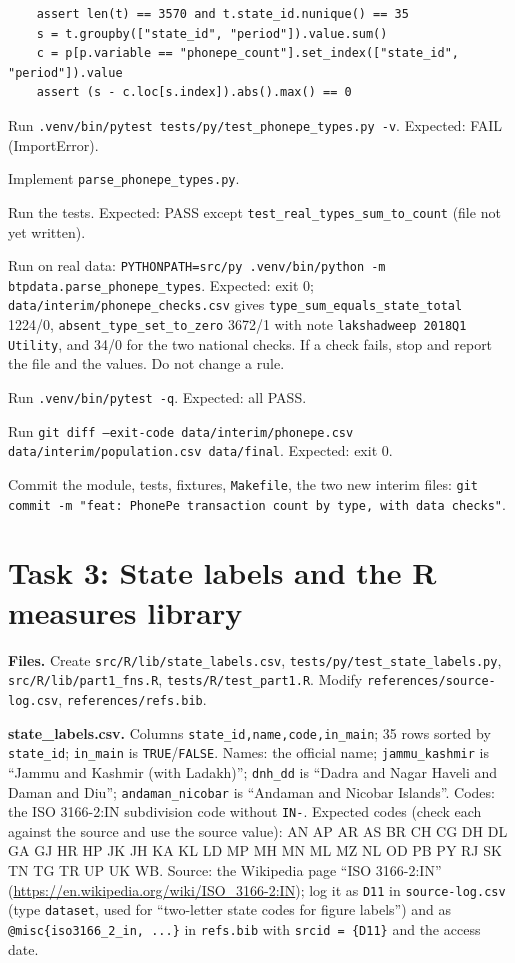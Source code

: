 \documentclass[10pt,a4paper]{article}
\newcommand{\f}[1]{\texttt{#1}}
\begin{document}
\begin{steps}
\begin{verbatim}
    assert len(t) == 3570 and t.state_id.nunique() == 35
    s = t.groupby(["state_id", "period"]).value.sum()
    c = p[p.variable == "phonepe_count"].set_index(["state_id", "period"]).value
    assert (s - c.loc[s.index]).abs().max() == 0
\end{verbatim}
\item Run \f{.venv/bin/pytest tests/py/test\_phonepe\_types.py -v}. Expected: FAIL (ImportError).
\item Implement \f{parse\_phonepe\_types.py}.
\item Run the tests. Expected: PASS except \f{test\_real\_types\_sum\_to\_count} (file not yet written).
\item Run on real data: \f{PYTHONPATH=src/py .venv/bin/python -m btpdata.parse\_phonepe\_types}. Expected: exit 0;
      \f{data/interim/phonepe\_checks.csv} gives \f{type\_sum\_equals\_state\_total} 1224/0,
      \f{absent\_type\_set\_to\_zero} 3672/1 with note \f{lakshadweep 2018Q1 Utility}, and 34/0 for the two
      national checks. If a check fails, stop and report the file and the values. Do not change a rule.
\item Run \f{.venv/bin/pytest -q}. Expected: all PASS.
\item Run \f{git diff --exit-code data/interim/phonepe.csv data/interim/population.csv data/final}. Expected: exit 0.
\item Commit the module, tests, fixtures, \f{Makefile}, the two new interim files:
      \f{git commit -m "feat: PhonePe transaction count by type, with data checks"}.
\end{steps}

\section{Task 3: State labels and the R measures library}
\textbf{Files.} Create \f{src/R/lib/state\_labels.csv}, \f{tests/py/test\_state\_labels.py},
\f{src/R/lib/part1\_fns.R}, \f{tests/R/test\_part1.R}. Modify \f{references/source-log.csv},
\f{references/refs.bib}.

\textbf{state\_labels.csv.} Columns \f{state\_id,name,code,in\_main}; 35 rows sorted by \f{state\_id};
\f{in\_main} is \f{TRUE}/\f{FALSE}. Names: the official name; \f{jammu\_kashmir} is ``Jammu and Kashmir (with
Ladakh)''; \f{dnh\_dd} is ``Dadra and Nagar Haveli and Daman and Diu''; \f{andaman\_nicobar} is ``Andaman and
Nicobar Islands''. Codes: the ISO 3166-2:IN subdivision code without \f{IN-}. Expected codes (check each against
the source and use the source value): AN AP AR AS BR CH CG DH DL GA GJ HR HP JK JH KA KL LD MP MH MN ML MZ NL OD
PB PY RJ SK TN TG TR UP UK WB. Source: the Wikipedia page ``ISO 3166-2:IN''
(\url{https://en.wikipedia.org/wiki/ISO_3166-2:IN}); log it as \f{D11} in \f{source-log.csv} (type
\f{dataset}, used for ``two-letter state codes for figure labels'') and as \f{@misc\{iso3166\_2\_in, ...\}} in
\f{refs.bib} with \f{srcid = \{D11\}} and the access date.
\end{document}
